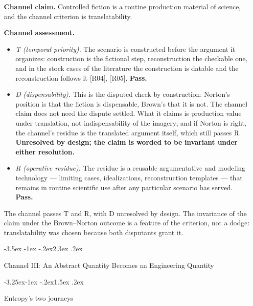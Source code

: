 \documentclass[11pt,a4paper]{article}
\makeatletter
\renewcommand\section{\@startsection{section}{1}{\z@}%
  {-3.5ex \@plus -1ex \@minus -.2ex}{2.3ex \@plus .2ex}%
  {\normalfont\Large\bfseries\raggedright}}
\renewcommand\subsection{\@startsection{subsection}{2}{\z@}%
  {-3.25ex\@plus -1ex \@minus -.2ex}{1.5ex \@plus .2ex}%
  {\normalfont\large\bfseries\raggedright}}
\makeatother
\begin{document}
\textbf{Channel claim.} Controlled fiction is a routine production material of science, and the channel criterion is translatability.

\textbf{Channel assessment.}

\begin{itemize}[leftmargin=1.6em,itemsep=2pt,parsep=0pt,topsep=3pt]
\item \textit{T (temporal priority).} The scenario is constructed before the argument it organizes: construction is the fictional step, reconstruction the checkable one, and in the stock cases of the literature the construction is datable and the reconstruction follows it [R04], [R05]. \textbf{Pass.}
\item \textit{D (dispensability).} This is the disputed check by construction: Norton's position is that the fiction is dispensable, Brown's that it is not. The channel claim does not need the dispute settled. What it claims is production value under translation, not indispensability of the imagery; and if Norton is right, the channel's residue is the translated argument itself, which still passes R. \textbf{Unresolved by design; the claim is worded to be invariant under either resolution.}
\item \textit{R (operative residue).} The residue is a reusable argumentative and modeling technology — limiting cases, idealizations, reconstruction templates — that remains in routine scientific use after any particular scenario has served. \textbf{Pass.}
\end{itemize}

The channel passes T and R, with D unresolved by design. The invariance of the claim under the Brown–Norton outcome is a feature of the criterion, not a dodge: translatability was chosen because both disputants grant it.

\section{Channel III: An Abstract Quantity Becomes an Engineering Quantity}

\subsection{Entropy's two journeys}
\end{document}
